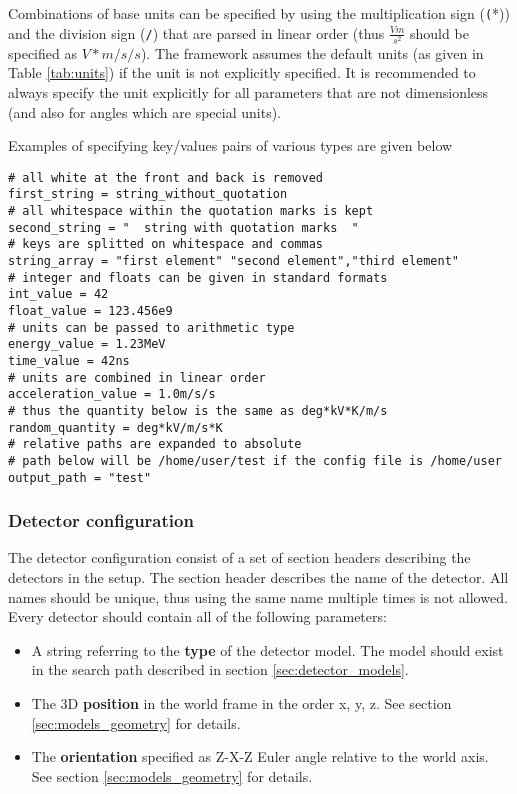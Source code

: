 Combinations of base units can be specified by using the multiplication sign (\texttt(*)) and the division sign (\texttt{/}) that are parsed in linear order (thus $\frac{V m}{s^2}$ should be specified as $V*m/s/s$). The framework assumes the default units (as given in Table \ref{tab:units}) if the unit is not explicitly specified. It is recommended to always specify the unit explicitly for all parameters that are not dimensionless (and also for angles which are special units). 

Examples of specifying key/values pairs of various types are given below
\begin{verbatim}
# all white at the front and back is removed
first_string = string_without_quotation
# all whitespace within the quotation marks is kept
second_string = "  string with quotation marks  "
# keys are splitted on whitespace and commas
string_array = "first element" "second element","third element"
# integer and floats can be given in standard formats
int_value = 42
float_value = 123.456e9
# units can be passed to arithmetic type
energy_value = 1.23MeV
time_value = 42ns
# units are combined in linear order
acceleration_value = 1.0m/s/s
# thus the quantity below is the same as deg*kV*K/m/s
random_quantity = deg*kV/m/s*K 
# relative paths are expanded to absolute 
# path below will be /home/user/test if the config file is /home/user
output_path = "test" 
\end{verbatim}

\subsubsection{Detector configuration}
\label{sec:detector_config}
The detector configuration consist of a set of section headers describing the detectors in the setup. The section header describes the name of the detector. All names should be unique, thus using the same name multiple times is not allowed. Every detector should contain all of the following parameters:
\begin{itemize}
\item A string referring to the \textbf{type} of the detector model. The model should exist in the search path described in section \ref{sec:detector_models}.
\item The 3D \textbf{position} in the world frame in the order x, y, z. See section \ref{sec:models_geometry} for details.
\item The \textbf{orientation} specified as Z-X-Z Euler angle relative to the world axis. See section \ref{sec:models_geometry} for details.
\end{itemize}

